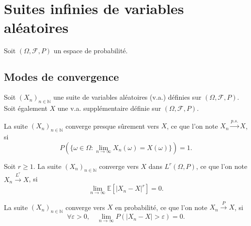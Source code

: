 \chapter{Suites infinies de variables aléatoires}
\sloppy


Soit $(\Omega, \mathcal{F}, P)$ un espace de probabilité.
\section{Modes de convergence}
Soit $(X_n)_{n \in \mathbb{N}}$ une suite de variables aléatoires (v.a.) définies sur $(\Omega, \mathcal{F}, P)$. Soit également $X$ une v.a. supplémentaire définie sur $(\Omega, \mathcal{F}, P)$.
\begin{definition}
La suite $(X_n)_{n \in \mathbb{N}}$ converge presque sûrement vers $X$, ce que l'on note $X_n \xrightarrow{p.s.} X$, si
\[
P(\{\omega \in \Omega : \lim_{n \to \infty} X_n(\omega) = X(\omega)\}) = 1.
\]
\end{definition}
\begin{definition}
Soit $r \geq 1$. La suite $(X_n)_{n \in \mathbb{N}}$ converge vers $X$ dans $L^r(\Omega, P)$, ce que l'on note $X_n \xrightarrow{L^r} X$, si
\[
\lim_{n \to \infty} \mathbb{E}[|X_n - X|^r] = 0.
\]
\end{definition}
\begin{definition}
La suite $(X_n)_{n \in \mathbb{N}}$ converge vers $X$ en probabilité, ce que l'on note $X_n \xrightarrow{P} X$, si
\[
\forall \varepsilon > 0, \quad \lim_{n \to \infty} P(|X_n - X| > \varepsilon) = 0.
\]
\end{definition}
